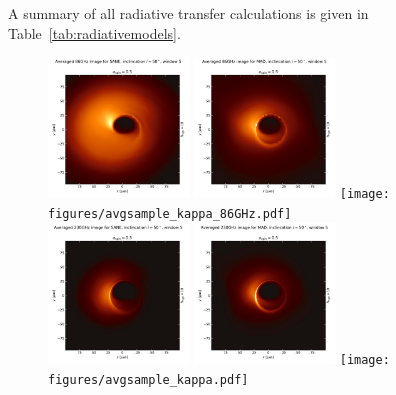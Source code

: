 A summary of all radiative transfer calculations is given in Table~\ref{tab:radiativemodels}.

\begin{figure}
  \centering
  \includegraphics[width=0.333\textwidth]{figures/avgsample_SANE_86GHz.pdf}%
  \includegraphics[width=0.333\textwidth]{figures/avgsample_MAD_86GHz.pdf}%
  \texttt{[image: figures/avgsample\_kappa\_86GHz.pdf]}\\
  \includegraphics[width=0.333\textwidth]{figures/avgsample_SANE.pdf}%
  \includegraphics[width=0.333\textwidth]{figures/avgsample_MAD.pdf}%
  \texttt{[image: figures/avgsample\_kappa.pdf]}\\

\end{figure}
